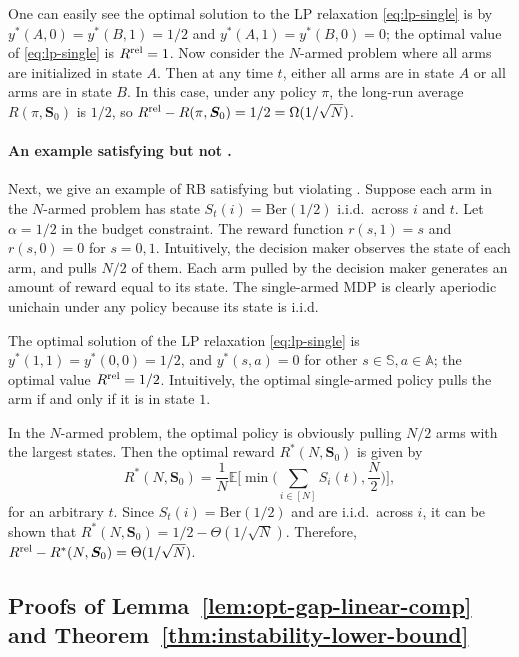 \documentclass[11pt,letterpaper]{article}
\theoremstyle{plain}
\theoremstyle{definition}
\theoremstyle{remark}
\newcommand{\EBig}[1]{\mathbb{E}\Big[#1\Big]}
\newcommand{\ve}[1]{\bm{#1}}
\newcommand{\veS}{\ve{S}}
\newcommand{\sspa}{\mathbb{S}}
\newcommand{\aspa}{\mathbb{A}}
\newcommand{\sumN}{\sum_{i\in[N]}}
\newcommand{\rel}{\textup{rel}} %
\newcommand{\ravg}{R}
\newcommand{\rsysn}{\ravg(\pi, \veS_0)}
\newcommand{\ropt}{\ravg^*(N, \veS_0)}
\newcommand{\rrel}{\ravg^\rel}
\begin{document}
One can easily see the optimal solution to the LP relaxation \eqref{eq:lp-single} is by $y^*(A, 0) = y^*(B, 1) = 1/2$ and $y^*(A, 1) = y^*(B, 0) = 0$; the optimal value of \eqref{eq:lp-single} is $\rrel = 1$. 
Now consider the $N$-armed problem where all arms are initialized in state $A$. Then at any time $t$, either all arms are in state $A$ or all arms are in state $B$. In this case, under any policy $\pi$, the long-run average $\rsysn$ is $1/2$, so $\rrel - \rsysn= 1/2 = \Omega(1/\sqrt{N})$.



\paragraph{An example satisfying  but not .}

Next, we give an example of RB satisfying  but violating . 
Suppose each arm in the $N$-armed problem has state $S_t(i) = \text{Ber}(1/2)$ i.i.d.\ across $i$ and $t$. Let $\alpha = 1/2$ in the budget constraint. The reward function $r(s,1) = s$ and $r(s,0) = 0$ for $s = 0, 1$. 
Intuitively, the decision maker observes the state of each arm, and pulls $N/2$ of them. Each arm pulled by the decision maker generates an amount of reward equal to its state. 
The single-armed MDP is clearly aperiodic unichain under any policy because its state is i.i.d.

The optimal solution of the LP relaxation \eqref{eq:lp-single} is $y^*(1,1) = y^*(0,0) = 1/2$, and $y^*(s,a) = 0$ for other $s\in\sspa, a\in\aspa$; the optimal value $\rrel = 1/2$. Intuitively, the optimal single-armed policy pulls the arm if and only if it is in state $1$.  

In the $N$-armed problem, the optimal policy is obviously pulling $N/2$ arms with the largest states. Then the optimal reward $\ropt$ is given by 
\[
    \ropt = \frac{1}{N}\EBig{\min\Big(\sumN S_i(t), \frac{N}{2}\Big)},
\]
for an arbitrary $t$. 
Since $S_t(i) = \text{Ber}(1/2)$ and are i.i.d.\ across $i$, it can be shown that $\ropt = 1/2 - \Theta(1/\sqrt{N})$. Therefore, $\rrel - \ropt = \Theta(1/\sqrt{N})$. 



\subsection{Proofs of Lemma~\ref{lem:opt-gap-linear-comp} and Theorem~\ref{thm:instability-lower-bound}}\label{app:proof_instability}
\end{document}
